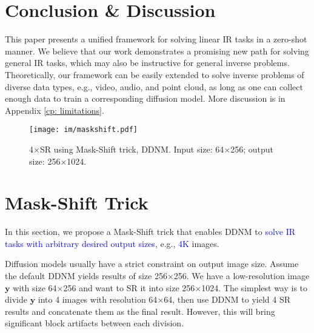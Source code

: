 \documentclass{article} \usepackage{iclr2023_conference,times}
\begin{document}
\section{Conclusion \& Discussion}
This paper presents a unified framework for solving linear IR tasks in a zero-shot manner. We believe that our work demonstrates a promising new path for solving general IR tasks, which may also be instructive for general inverse problems. Theoretically, our framework can be easily extended to solve inverse problems of diverse data types, e.g., video, audio, and point cloud, as long as one can collect enough data to train a corresponding diffusion model. More discussion is in Appendix \ref{cp: limitations}.


\begin{figure*}[t]
  \centering
  \vspace{-0.5cm}
  \texttt{[image: im/maskshift.pdf]}
  \vspace{-0.5cm}
  \caption{4$\times$SR using Mask-Shift trick, DDNM. Input size: 64$\times$256; output size: 256$\times$1024.}
\label{fig:maskshift} 
\end{figure*}

\section{Mask-Shift Trick}
In this section, we propose a Mask-Shift trick that enables DDNM to \textcolor{blue}{solve IR tasks with arbitrary desired output sizes}, e.g., \textcolor{blue}{4K} images.

Diffusion models usually have a strict constraint on output image size. Assume the default DDNM yields results of size 256$\times$256. We have a low-resolution image $\mathbf{y}$ with size 64$\times$256 and want to SR it into size 256$\times$1024. The simplest way is to divide $\mathbf{y}$ into 4 images with resolution 64$\times$64, then use DDNM to yield 4 SR results and concatenate them as the final result. However, this will bring significant block artifacts between each division.
\end{document}
